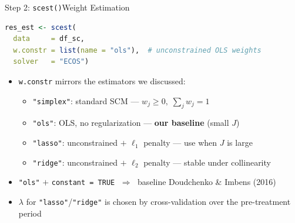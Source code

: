 \documentclass[hyperref={pdfpagelabels=false}]{beamer}
\begin{document}
\begin{frame}[fragile]{Step 2: \texttt{scest()}}{Weight Estimation}
\begin{lstlisting}[language=R, style=r-style]
res_est <- scest(
  data     = df_sc,
  w.constr = list(name = "ols"),  # unconstrained OLS weights
  solver   = "ECOS")
\end{lstlisting}
\vspace{0.2cm}
\begin{itemize}
    \item \texttt{w.constr} mirrors the estimators we discussed:
    \begin{itemize}
        \vspace{0.1cm}
        \item \texttt{"simplex"}: standard SCM --- $w_j \geq 0,\;\sum_j w_j = 1$
        \vspace{0.1cm}
        \item \texttt{"ols"}: OLS, no regularization --- \textbf{our baseline} (small $J$)
        \vspace{0.1cm}
        \item \texttt{"lasso"}: unconstrained $+$ $\ell_1$ penalty --- use when $J$ is large
        \vspace{0.1cm}
        \item \texttt{"ridge"}: unconstrained $+$ $\ell_2$ penalty --- stable under collinearity
    \end{itemize}
    \vspace{0.2cm}
    \item \texttt{"ols"} $+$ \texttt{constant = TRUE} $\;\Rightarrow\;$ baseline Doudchenko \& Imbens (2016)
    \vspace{0.1cm}
    \item $\lambda$ for \texttt{"lasso"}/\texttt{"ridge"} is chosen by cross-validation over the pre-treatment period
\end{itemize}
\end{frame}
\end{document}
